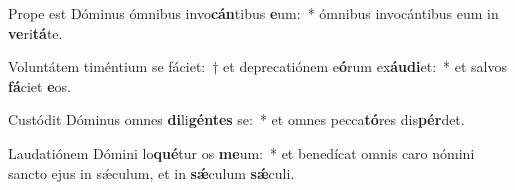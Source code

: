 \item Prope est Dóminus ómnibus invo\textbf{cán}tibus \textbf{e}um:~* ómnibus invocántibus eum in \textbf{ve}ri\textbf{tá}te.
\item Voluntátem timéntium se fáciet:~† et deprecatiónem e\textbf{ó}rum ex\textbf{áu}\textbf{di}et:~* et salvos \textbf{fá}ciet \textbf{e}os.
\item Custódit Dóminus omnes \textbf{di}li\textbf{gén}\textbf{tes} se:~* et omnes pecca\textbf{tó}res dis\textbf{pér}det.
\item Laudatiónem Dómini lo\textbf{qué}tur os \textbf{me}um:~* et benedícat omnis caro nómini sancto ejus in sǽculum, et in \textbf{sǽ}culum \textbf{sǽ}culi.
